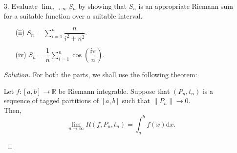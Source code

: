 \documentclass[12pt]{article}
\theoremstyle{definition}
\newenvironment{soln}{\begin{proof}[Solution]}{\end{proof}}
\begin{document}
\begin{itemize}
\begin{itemize}
\begin{soln}
			Thus, we get that $F' = f \ge 0$ and hence, $F$ is increasing. Thus, we get
			\begin{equation*} 
				F(a) \le F(x) \le F(b)
			\end{equation*}
			for all $x \in [a, b].$ However, note that $F(a) = 0 = F(b)$ and hence, $F$ is constant. Thus, 
			\begin{equation*} 
				f(x) = F'(x) = 0,
			\end{equation*}
			for all $x \in [a, b],$ as desired.
		\end{soln}
		\item[(b)] Give an example of a Riemann integrable function on $[a, b]$ such that $f(x)	\ge 0$ for all $x \in [a, b]$ and $\displaystyle\int_{a}^{b} f(x) {\mathrm{d}}x = 0,$ but $f(x) \neq 0$ for some $x \in [a, b].$
		\begin{soln}
			Let $a = 0, b = 2$ and $f:[a, b] \to \mathbb{R}$ be defined as
			\begin{equation*} 
				f(x) \vcentcolon= \begin{cases}
					0 & x \neq 1,\\
					1 & x = 1.
				\end{cases}
			\end{equation*}
			Show that $f$ is actually Riemann integrable on $[0, 2]$ with the integral equal to $0.$
		\end{soln}
	\end{itemize}
	\newpage
	\item[3.] Evaluate $\displaystyle\lim_{n\to \infty}S_n$ by showing that $S_n$ is an appropriate Riemann sum for a suitable function over a suitable interval.

	\begin{itemize}
		\item[(ii)] $S_n = \sum_{i = 1}^{n}\dfrac{n}{i^2 + n^2}.$
		\item[(iv)] $S_n = \dfrac{1}{n}\sum_{i = 1}^{n}\cos\left(\dfrac{i\pi}{n}\right).$
	\end{itemize}

	\begin{soln}
		For both the parts, we shall use the following theorem:
		
		\begin{thm}
			Let $f:[a, b] \to \mathbb{R}$ be Riemann integrable. Suppose that $(P_n, t_n)$ is a sequence of tagged partitions of $[a, b]$ such that $\|P_n\| \to 0.$\\
			Then,
			\begin{equation*} 
				\lim_{n\to \infty}R(f, P_n, t_n) = \int_{a}^{b} f(x) {\mathrm{d}}x.
			\end{equation*}
		\end{thm}


\end{soln}
\end{itemize}
\end{document}
